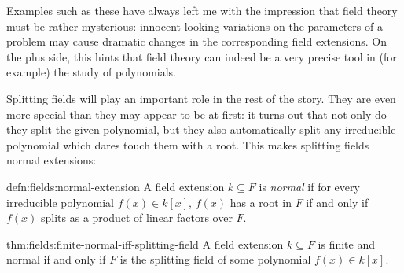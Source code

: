 Examples such as these have always left me with the impression that
field theory must be rather mysterious: innocent-looking variations on
the parameters of a problem may cause dramatic changes in the
corresponding field extensions. On the plus side, this hints that
field theory can indeed be a very precise tool in (for example) the
study of polynomials.

Splitting fields will play an important role in the rest of the
story. They are even more special than they may appear to be at first:
it turns out that not only do they split the given polynomial, but
they also automatically split any irreducible polynomial which dares
touch them with a root. This makes splitting fields normal extensions:
\begin{defn}{}{defn:fields:normal-extension}
  A field extension $k \subseteq F$ is \emph{normal} if for every
  irreducible polynomial $f(x) \in k[x]$, $f(x)$ has a root in $F$ if
  and only if $f(x)$ splits as a product of linear factors over $F$.
\end{defn}
\begin{thm}{}{thm:fields:finite-normal-iff-splitting-field}
  A field extension $k \subseteq F$ is finite and normal if and only
  if $F$ is the splitting field of some polynomial $f(x) \in k[x]$.
\end{thm}

